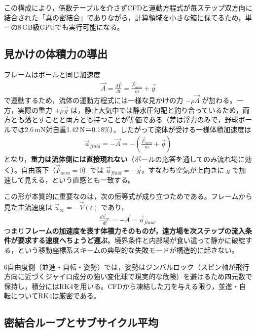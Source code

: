 この構成により，係数テーブルを介さずCFDと運動方程式が毎ステップ双方向に結合された「真の密結合」でありながら，計算領域を小さな箱に保てるため，単一の8\,GB級GPUでも実行可能になる。

\subsection{見かけの体積力の導出}
\label{sec:apparent-force}

フレームはボールと同じ加速度
\begin{align}
	\vec A = \frac{d\vec V}{dt} = \frac{\vec F_{aero}}{m} + \vec g
	\label{eq:frame-accel}
\end{align}
で運動するため，流体の運動方程式には一様な見かけの力 \(-\rho\vec A\) が加わる。一方，実際の重力 \(+\rho\vec g\) は，静止大気中では静水圧勾配と釣り合っているため，両方とも落とすことと両方とも持つことが等価である（差は浮力のみで，野球ボールでは2.6\,mN対自重1.42\,N＝0.18\%）。したがって流体が受ける一様体積加速度は
\begin{align}
	\vec a_{fluid} = -\vec A = -\left(\frac{\vec F_{aero}}{m} + \vec g\right)
	\label{eq:apparent-force}
\end{align}
となり，\textbf{重力は流体側には直接現れない}（ボールの応答を通してのみ流れ場に効く）。自由落下（\(\vec F_{aero}=0\)）では \(\vec a_{fluid}=-\vec g\)，すなわち空気が上向きに \(g\) で加速して見える，という直感とも一致する。

この形が本質的に重要なのは，次の恒等式が成り立つためである。フレームから見た主流速度は \(\vec u_\infty=-\vec V(t)\) であり，
\begin{align}
	\frac{d\vec u_\infty}{dt} = -\vec A = \vec a_{fluid}.
	\label{eq:identity}
\end{align}
つまり\textbf{フレームの加速度を表す体積力そのものが，遠方場を次ステップの流入条件が要求する速度へちょうど運ぶ}。境界条件と内部場が食い違って静かに破綻する，という移動座標系スキームの典型的な失敗モードが構造的に起きない。

6自由度側（並進・自転・姿勢）では，姿勢はジンバルロック（スピン軸が飛行方向に近づくジャイロ成分の強い変化球で現実的な危険）を避けるため四元数で保持し，積分にはRK4を用いる。CFDから凍結した力を与える限り，並進・自転についてRK4は厳密である。

\subsection{密結合ループとサブサイクル平均}
\label{sec:coupling-loop}

